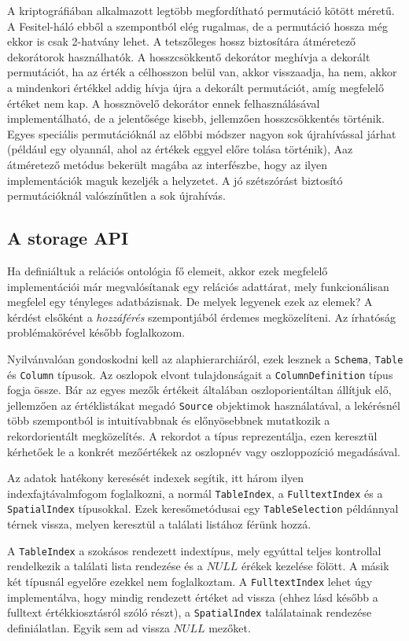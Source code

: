 \documentclass[
    parspace,
    noindent,
    nohyp,
]{elteiktdk}[2023/04/10]
\begin{document}
A kriptográfiában alkalmazott legtöbb megfordítható permutáció kötött méretű.
A Fesitel-háló ebből a szempontból elég rugalmas,
de a permutáció hossza még ekkor is csak 2-hatvány lehet.
A tetszőleges hossz biztosítára átméretező dekorátorok használhatók.
A hosszcsökkentő dekorátor meghívja a dekorált permutációt,
ha az érték a célhosszon belül van, akkor visszaadja, ha nem,
akkor a mindenkori értékkel addig hívja újra a dekorált permutációt,
amíg megfelelő értéket nem kap.
A hossznövelő dekorátor ennek felhasználásával implementálható,
de a jelentősége kisebb, jellemzően hosszcsökkentés történik.
Egyes speciális permutációknál az előbbi módszer nagyon sok újrahívással járhat
(például egy olyannál, ahol az értékek eggyel előre tolása történik),
Aaz átméretező metódus bekerült magába az interfészbe,
hogy az ilyen implementációk maguk kezeljék a helyzetet.
A jó szétszórást biztosító permutációknál valószínűtlen a sok újrahívás.

\subsection{A storage API}

Ha definiáltuk a relációs ontológia fő elemeit,
akkor ezek megfelelő implementációi már megvalósítanak egy relációs adattárat,
mely funkcionálisan megfelel egy tényleges adatbázisnak.
De melyek legyenek ezek az elemek?
A kérdést elsőként a \textit{hozzáférés} szempontjából érdemes megközelíteni.
Az írhatóság problémakörével később foglalkozom.

Nyilvánvalóan gondoskodni kell az alaphierarchiáról,
ezek lesznek a \texttt{Schema}, \texttt{Table} és \texttt{Column} típusok.
Az oszlopok elvont tulajdonságait a \texttt{ColumnDefinition} típus fogja össze.
Bár az egyes mezők értékeit általában oszloporientáltan állítjuk elő,
jellemzően az értéklistákat megadó \texttt{Source} objektimok használatával,
a lekérésnél több szempontból is intuitívabbnak és előnyösebbnek mutatkozik
a rekordorientált megközelítés.
A rekordot a  típus reprezentálja,
ezen keresztül kérhetőek le a konkrét mezőértékek
az oszlopnév vagy oszloppozíció megadásával.

Az adatok hatékony keresését indexek segítik, itt három ilyen indexfajtávalmfogom foglalkozni,
a normál \texttt{TableIndex}, a \texttt{FulltextIndex} és a \texttt{SpatialIndex} típusokkal.
Ezek keresőmetódusai egy \texttt{TableSelection} példánnyal térnek vissza,
melyen keresztül a találati listához férünk hozzá.

A \texttt{TableIndex} a szokásos rendezett indextípus,
mely egyúttal teljes kontrollal rendelkezik a találati lista rendezése
és a $NULL$ érékek kezelése fölött.
A másik két típusnál egyelőre ezekkel nem foglalkoztam.
A \texttt{FulltextIndex} lehet úgy implementálva, hogy mindig rendezett értéket ad vissza
(ehhez lásd később a fulltext értékkiosztásról szóló részt),
a \texttt{SpatialIndex} találatainak rendezése definiálatlan.
Egyik sem ad vissza $NULL$ mezőket.
\end{document}
